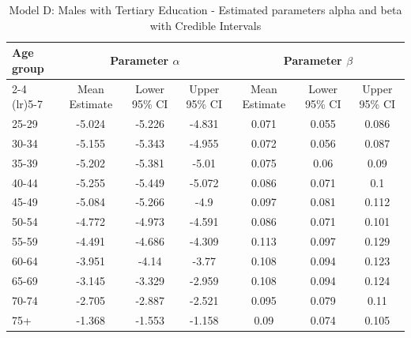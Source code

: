 \begin{landscape}
\begin{table}[htbp]
\centering
\caption{Model D: Males with Tertiary Education - Estimated parameters alpha and beta  with Credible Intervals}
\label{tab:parameters_ab32}
\begin{tabular}{@{}lcccccc@{}}
\toprule
Age group & \multicolumn{3}{c}{Parameter \(\alpha\)} & \multicolumn{3}{c}{Parameter \(\beta\)} \\ 
\cmidrule(lr){2-4} \cmidrule(lr){5-7}
          & Mean Estimate & Lower 95\% CI & Upper 95\% CI & Mean Estimate & Lower 95\% CI & Upper 95\% CI \\ 
\midrule
25-29 & -5.024 & -5.226 & -4.831 & 0.071 & 0.055 & 0.086 \\
30-34 & -5.155 & -5.343 & -4.955 & 0.072 & 0.056 & 0.087 \\
35-39 & -5.202 & -5.381 & -5.01 & 0.075 & 0.06 & 0.09 \\
40-44 & -5.255 & -5.449 & -5.072 & 0.086 & 0.071 & 0.1 \\
45-49 & -5.084 & -5.266 & -4.9 & 0.097 & 0.081 & 0.112 \\
50-54 & -4.772 & -4.973 & -4.591 & 0.086 & 0.071 & 0.101 \\
55-59 & -4.491 & -4.686 & -4.309 & 0.113 & 0.097 & 0.129 \\
60-64 & -3.951 & -4.14 & -3.77 & 0.108 & 0.094 & 0.123 \\
65-69 & -3.145 & -3.329 & -2.959 & 0.108 & 0.094 & 0.124 \\
70-74 & -2.705 & -2.887 & -2.521 & 0.095 & 0.079 & 0.11 \\
75+ & -1.368 & -1.553 & -1.158 & 0.09 & 0.074 & 0.105 \\
\bottomrule
\end{tabular}
\end{table}
\end{landscape}